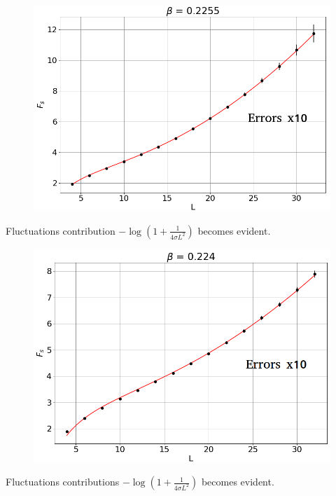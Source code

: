 \documentclass[12pt,handout]{beamer}
\begin{document}
\begin{frame}
\begin{center}
\begin{figure}[!htb]
\centering
\includegraphics[scale=0.4, center]{0225.png}
\end{figure}
Fluctuations contribution $- \log \left( 1 + \frac{1}{4 \sigma L^2} \right)$ becomes evident.
\end{center}
\end{frame}

\begin{frame}
\begin{center}
\begin{figure}[!htb]
\centering
\includegraphics[scale=0.4, center]{0224.png}
\end{figure}
Fluctuations contributions $- \log \left( 1 + \frac{1}{4 \sigma L^2} \right)$ becomes evident.
\end{center}
\end{frame}
\end{document}
